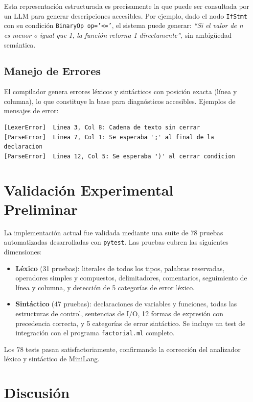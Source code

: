 \documentclass[conference]{IEEEtran}
\begin{document}
Esta representación estructurada es precisamente la que puede ser consultada por un LLM para generar descripciones accesibles. Por ejemplo, dado el nodo \texttt{IfStmt} con su condición \texttt{BinaryOp op='<='}, el sistema puede generar: \textit{``Si el valor de n es menor o igual que 1, la función retorna 1 directamente''}, sin ambigüedad semántica.

\subsection{Manejo de Errores}

El compilador genera errores léxicos y sintácticos con posición exacta (línea y columna), lo que constituye la base para diagnósticos accesibles. Ejemplos de mensajes de error:

\begin{lstlisting}[language={},numbers=none]
[LexerError]  Linea 3, Col 8: Cadena de texto sin cerrar
[ParseError]  Linea 7, Col 1: Se esperaba ';' al final de la declaracion
[ParseError]  Linea 12, Col 5: Se esperaba ')' al cerrar condicion
\end{lstlisting}

\section{Validación Experimental Preliminar}

La implementación actual fue validada mediante una suite de 78 pruebas automatizadas desarrolladas con \texttt{pytest}. Las pruebas cubren las siguientes dimensiones:

\begin{itemize}
    \item \textbf{Léxico} (31 pruebas): literales de todos los tipos, palabras reservadas, operadores simples y compuestos, delimitadores, comentarios, seguimiento de línea y columna, y detección de 5 categorías de error léxico.
    \item \textbf{Sintáctico} (47 pruebas): declaraciones de variables y funciones, todas las estructuras de control, sentencias de I/O, 12 formas de expresión con precedencia correcta, y 5 categorías de error sintáctico. Se incluye un test de integración con el programa \texttt{factorial.ml} completo.
\end{itemize}

Los 78 tests pasan satisfactoriamente, confirmando la corrección del analizador léxico y sintáctico de MiniLang.

\section{Discusión}
\end{document}

